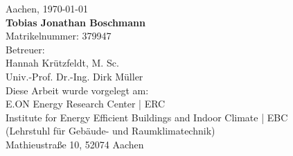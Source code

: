 \begin{titlepage}
\begin{addmargin}[\marginCoverPage]{0cm}
\vfill
\begin{center}
\begingroup
{}\selectfont
Aachen, \monthyeardate\today \\
\addvspace{0.5cm}
\textbf{Tobias Jonathan Boschmann} \\
Matrikelnummer: 379947 \\
\addvspace{0.5cm}
Betreuer:\\
Hannah Krützfeldt, M. Sc. \\
Univ.-Prof. Dr.-Ing. Dirk Müller \\
\addvspace{0.5cm}
Diese Arbeit wurde vorgelegt am:\\
E.ON Energy Research Center | ERC \\
Institute for Energy Efficient Buildings and Indoor Climate | EBC\\
(Lehrstuhl für Gebäude- und Raumklimatechnik)\\
Mathieustraße 10, 52074 Aachen\\
\endgroup
\end{center}
\end{addmargin}
\end{titlepage}

